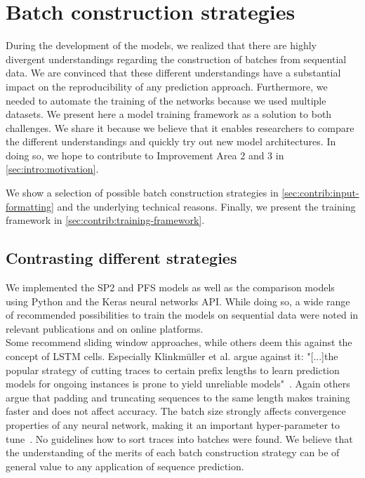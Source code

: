 \chapter{Batch construction strategies}\label{chap:training-framework}
During the development of the models, we realized that there are highly divergent understandings regarding the construction of batches from sequential data.
We are convinced that these different understandings have a substantial impact on the reproducibility of any prediction approach.
Furthermore, we needed to automate the training of the networks because we used multiple datasets.
We present here a model training framework as a solution to both challenges.
We share it because we believe that it enables researchers to compare the different understandings and quickly try out new model architectures.
In doing so, we hope to contribute to Improvement Area 2 and 3 in \autoref{sec:intro:motivation}.

We show a selection of possible batch construction strategies in \autoref{sec:contrib:input-formatting} and the underlying technical reasons. Finally, we present the training framework in \autoref{sec:contrib:training-framework}.

\section{Contrasting different strategies}\label{sec:contrib:input-formatting}
We implemented the SP2 and PFS models as well as the comparison models using Python and the Keras neural networks API.
While doing so, a wide range of recommended possibilities to train the models on sequential data were noted in relevant publications and on online platforms.\\

Some recommend sliding window approaches, while others deem this against the concept of LSTM cells.
Especially Klinkmüller et al. argue against it: "[...]the popular strategy of cutting traces to certain prefix lengths to learn prediction models for ongoing instances is prone to yield unreliable models"~\cite{klinkmuller2018reliablemonitoring}.
Again others argue that padding and truncating sequences to the same length makes training faster and does not affect accuracy.
The batch size strongly affects convergence properties of any neural network, making it an important hyper-parameter to tune~\cite{keskar2016large}.
No guidelines how to sort traces into batches were found.
We believe that the understanding of the merits of each batch construction strategy can be of general value to any application of sequence prediction.\\

